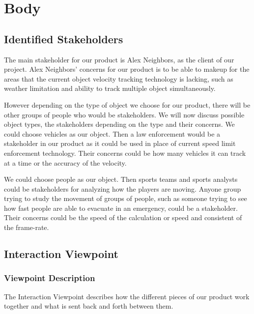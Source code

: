 \documentclass[letterpaper,10pt,onecolumn,draftclsnofoot]{IEEEtran}
\begin{document}
\section{Body}
\subsection{Identified Stakeholders}
The main stakeholder for our product is Alex Neighbors, as the client of our project.
Alex Neighbors' concerns for our product is to be able to makeup for the areas that the current object velocity tracking technology is lacking, such as weather limitation and ability to track multiple object simultaneously. 

However depending on the type of object we choose for our product, there will be other groups of people who would be stakeholders. 
We will now discuss possible object types, the stakeholders depending on the type and their concerns.
We could choose vehicles as our object. Then a law enforcement would be a stakeholder in our product as it could be used in place of current speed limit enforcement technology.
Their concerns could be how many vehicles it can track at a time or the accuracy of the velocity.

We could choose people as our object. Then sports teams and sports analysts could be stakeholders for analyzing how the players are moving. Anyone group trying to study the movement of groups of people, such as someone trying to see how fast people are able to evacuate in an emergency, could be a stakeholder.
Their concerns could be the speed of the calculation or speed and consistent of the frame-rate.


\subsection{Interaction Viewpoint}
\subsubsection{Viewpoint Description}

The Interaction Viewpoint describes how the different pieces of our product work together and what is sent back and forth between them. 
\end{document}
